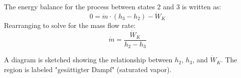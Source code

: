 The energy balance for the process between states 2 and 3 is written as:  
\[
0 = \dot{m} \cdot (h_3 - h_2) - \dot{W}_K
\]  
Rearranging to solve for the mass flow rate:  
\[
\dot{m} = \frac{\dot{W}_K}{h_2 - h_3}
\]  

A diagram is sketched showing the relationship between \( h_2 \), \( h_3 \), and \( \dot{W}_K \). The region is labeled "gesättigter Dampf" (saturated vapor).